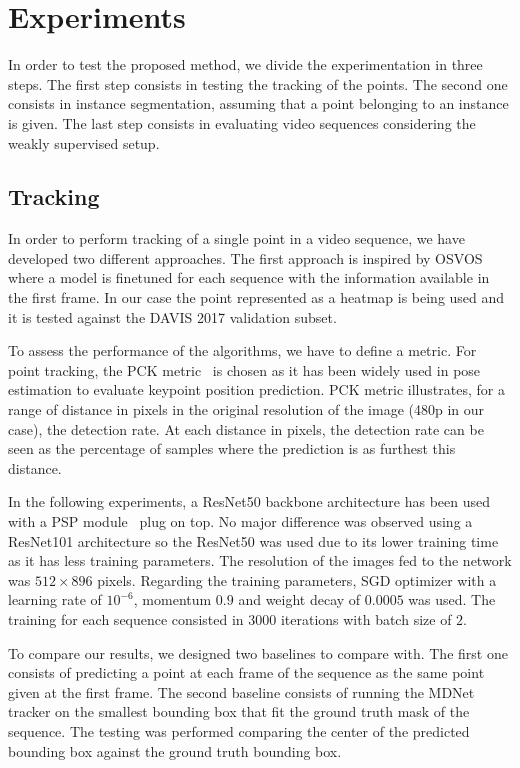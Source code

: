 
\section{Experiments}

In order to test the proposed method, we divide the experimentation in three steps.
The first step consists in testing the tracking of the points.
The second one consists in instance segmentation, assuming that a point belonging to an instance is given.
The last step consists in evaluating video sequences considering the weakly supervised setup.

\subsection{Tracking}

In order to perform tracking of a single point in a video sequence, we have developed two different approaches.
The first approach is inspired by OSVOS~\osvos{} where a model is finetuned for each sequence with the information available in the first frame.
In our case the point represented as a heatmap is being used and it is tested against the DAVIS 2017 validation subset.

To assess the performance of the algorithms, we have to define a metric.
For point tracking, the PCK metric~\pckmetric{} is chosen as it has been widely used in pose estimation to evaluate keypoint position prediction.
PCK metric illustrates, for a range of distance in pixels in the original resolution of the image (480p in our case), the detection rate.
At each distance in pixels, the detection rate can be seen as the percentage of samples where the prediction is as furthest this distance. %

In the following experiments, a ResNet50 backbone architecture has been used with a PSP module~\pspnet{} plug on top.
No major difference was observed using a ResNet101 architecture so the ResNet50 was used due to its lower training time as it has less training parameters.
The resolution of the images fed to the network was $512 \times 896$ pixels.
Regarding the training parameters, SGD optimizer with a learning rate of $10^{-6}$, momentum $0.9$ and weight decay of $0.0005$ was used. The training for each sequence consisted in 3000 iterations with batch size of $2$.

To compare our results, we designed two baselines to compare with.
The first one consists of predicting a point at each frame of the sequence as the same point given at the first frame.
The second baseline consists of running the MDNet~\mdnet{} tracker on the smallest bounding box that fit the ground truth mask of the sequence.
The testing was performed comparing the center of the predicted bounding box against the ground truth bounding box.

